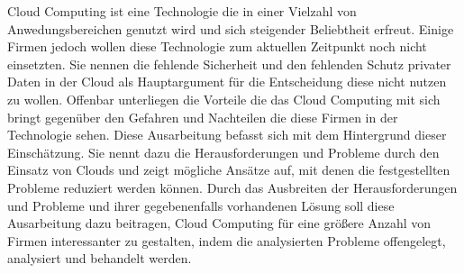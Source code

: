 Cloud Computing ist eine Technologie die in einer Vielzahl von Anwedungsbereichen genutzt wird und sich steigender Beliebtheit erfreut. Einige Firmen jedoch wollen diese Technologie zum aktuellen Zeitpunkt noch nicht einsetzten. Sie nennen die fehlende Sicherheit und den fehlenden Schutz privater Daten in der Cloud als Hauptargument für die Entscheidung diese nicht nutzen zu wollen. Offenbar unterliegen die Vorteile die das Cloud Computing mit sich bringt gegenüber den Gefahren und Nachteilen die diese Firmen in der Technologie sehen. Diese Ausarbeitung befasst sich mit dem Hintergrund dieser Einschätzung. Sie nennt dazu die Herausforderungen und Probleme durch den Einsatz von Clouds und zeigt mögliche Ansätze auf, mit denen die festgestellten Probleme reduziert werden können. Durch das Ausbreiten der Herausforderungen und Probleme und ihrer gegebenenfalls vorhandenen Lösung soll diese Ausarbeitung dazu beitragen, Cloud Computing für eine größere Anzahl von Firmen interessanter zu gestalten, indem die analysierten Probleme offengelegt, analysiert und behandelt werden.

